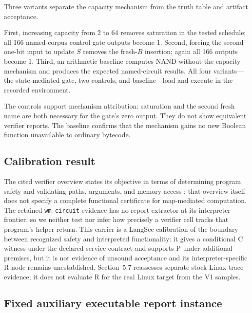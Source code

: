 \documentclass[conference]{IEEEtran}
\begin{document}
Three variants separate the capacity mechanism from the truth table and artifact acceptance.

First, increasing capacity from 2 to 64 removes saturation in the tested schedule; all 166 named-corpus control gate outputs become 1. Second, forcing the second one-bit input to update $S$ removes the fresh-$B$ insertion; again all 166 outputs become 1. Third, an arithmetic baseline computes NAND without the capacity mechanism and produces the expected named-circuit results. All four variants---the state-mediated gate, two controls, and baseline---load and execute in the recorded environment.

The controls support mechanism attribution: saturation and the second fresh name are both necessary for the gate's zero output. They do not show equivalent verifier reports. The baseline confirms that the mechanism gains no new Boolean function unavailable to ordinary bytecode.

\subsection{Calibration result}

The cited verifier overview states its objective in terms of determining program safety and validating paths, arguments, and memory access \cite{ref9}; that overview itself does not specify a complete functional certificate for map-mediated computation. The retained \texttt{wm\_circuit} evidence has no report extractor at its interpreter frontier, so we neither test nor infer how precisely a verifier cell tracks that program's helper return. This carrier is a LangSec calibration of the boundary between recognized safety and interpreted functionality: it gives a conditional C witness under the declared service contract and supports P under additional premises, but it is not evidence of unsound acceptance and its interpreter-specific R node remains unestablished. Section~5.7 reassesses separate stock-Linux trace evidence; it does not evaluate R for the real Linux target from the V1 samples.

\subsection{Fixed auxiliary executable report instance}
\end{document}
